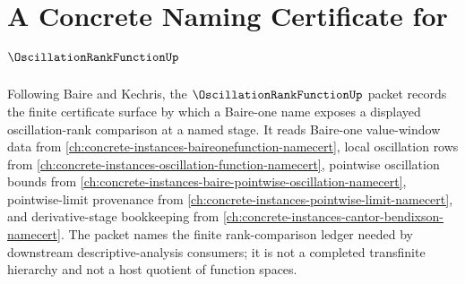 \chapter{A Concrete Naming Certificate for $\OscillationRankFunctionUp$}
\label{ch:concrete-instances-oscillation-rank-function-namecert}

Following Baire and Kechris, the $\OscillationRankFunctionUp$ packet records the finite certificate surface by which a Baire-one name exposes a displayed oscillation-rank comparison at a named stage. It reads Baire-one value-window data from \autoref{ch:concrete-instances-baireonefunction-namecert}, local oscillation rows from \autoref{ch:concrete-instances-oscillation-function-namecert}, pointwise oscillation bounds from \autoref{ch:concrete-instances-baire-pointwise-oscillation-namecert}, pointwise-limit provenance from \autoref{ch:concrete-instances-pointwise-limit-namecert}, and derivative-stage bookkeeping from \autoref{ch:concrete-instances-cantor-bendixson-namecert}. The packet names the finite rank-comparison ledger needed by downstream descriptive-analysis consumers; it is not a completed transfinite hierarchy and not a host quotient of function spaces.

